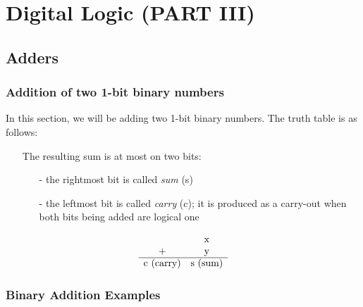 \documentclass[12pt,openany, tikz,border=10pt]{book}
\begin{document}
			      	
			      	
			      	\chapter{Digital Logic (PART III)}
			      	\section{Adders}
			      	\subsection{Addition of two 1-bit binary numbers}
			      	In this section, we will be adding two 1-bit binary numbers. The truth table is as follows:
			      	\begin{itemize}
			      		\item[] The resulting sum is at most on two bits:
			      		      \begin{itemize}
			      		      	\item[-] the rightmost bit is called \textit{sum} (s)
			      		      	\item[-] the leftmost bit is called \textit{carry} (c); it is produced as a carry-out when both bits being added are logical one
			      		      \end{itemize}
			      	\end{itemize}
			      	
			      	
			      	\[
			      		\begin{array}{cccccc}
			      			            & $x$       \\
			      			+           & $y$       \\
			      			\hline
			      			$c (carry)$ & $s (sum)$ \\
			      		\end{array}
			      	\]
			      	    
			      	\subsection{Binary Addition Examples}
			      	
\end{document}
